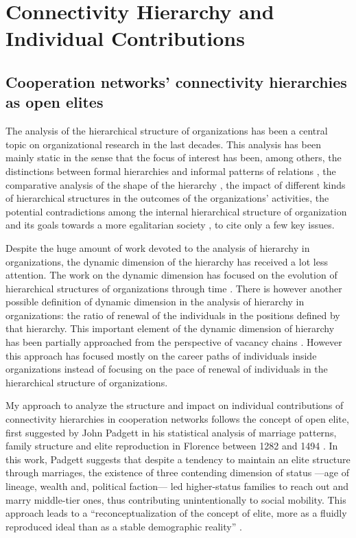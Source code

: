 \chapter{Connectivity Hierarchy and Individual Contributions}
\label{contributions}

\section{Cooperation networks' connectivity hierarchies as open elites}

The analysis of the hierarchical structure of organizations has been a central topic on organizational research in the last decades. This analysis has been mainly static in the sense that the focus of interest has been, among others, the distinctions between formal hierarchies and informal patterns of relations \citep{krackhardt:1993, mcfarland:2001}, the comparative analysis of the shape of the hierarchy \citep{blau:1962,blau:1964}, the impact of different kinds of hierarchical structures in the outcomes of the organizations' activities, the potential contradictions among the internal hierarchical structure of organization and its goals towards a more egalitarian society \citep{michels:1915,selznick:1949}, to cite only a few key issues.

Despite the huge amount of work devoted to the analysis of hierarchy in organizations, the dynamic dimension of the hierarchy has received a lot less attention. The work on the dynamic dimension has focused on the evolution of hierarchical structures of organizations through time \citep{blau:1969}. There is however another possible definition of dynamic dimension in the analysis of hierarchy in organizations: the ratio of renewal of the individuals in the positions defined by that hierarchy. This important element of the dynamic dimension of hierarchy has been partially approached from the perspective of vacancy chains \citep{white:1970,stewman:1983}. However this approach has focused mostly on the career paths of individuals inside organizations instead of focusing on the pace of renewal of individuals in the hierarchical structure of organizations.

My approach to analyze the structure and impact on individual contributions of connectivity hierarchies in cooperation networks follows the concept of open elite, first suggested by John Padgett in his statistical analysis of marriage patterns, family structure and elite reproduction in Florence between 1282 and 1494 \citep{padgett:2010}. In this work, Padgett suggests that despite a tendency to maintain an elite structure through marriages, the existence of three contending dimension of status ---age of lineage, wealth and, political faction--- led higher-status families to reach out and marry middle-tier ones, thus contributing unintentionally to social mobility. This approach leads to a ``reconceptualization of the concept of elite, more as a fluidly reproduced ideal than as a stable demographic reality'' \citep[360]{padgett:2010}. 

